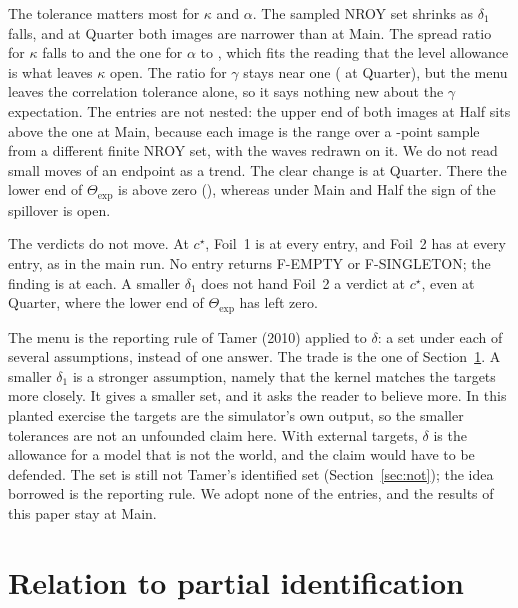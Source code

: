 \documentclass[11pt]{article}
\newcommand{\expset}{\mathrm{exp}}
\begin{document}
The tolerance matters most for $\kappa$ and $\alpha$. The sampled NROY set
shrinks as $\delta_1$ falls, and at Quarter both images are narrower than at
Main. The spread ratio for $\kappa$ falls to
\MenuDeltaQuarterSpreadRatioKappa{} and the one for $\alpha$ to
\MenuDeltaQuarterSpreadRatioAlpha, which fits the reading that the level
allowance is what leaves $\kappa$ open. The ratio for $\gamma$ stays near one
(\MenuDeltaQuarterSpreadRatioGamma{} at Quarter), but the menu leaves the
correlation tolerance alone, so it says nothing new about the $\gamma$
expectation. The entries are not nested: the upper end of both images at
Half sits above the one at Main, because each image is the range over a
\ThetaSample-point sample from a different finite NROY set, with the waves
redrawn on it. We do not read small moves of an endpoint as a trend. The
clear change is at Quarter. There the lower end of $\Theta_{\expset}$ is
above zero (\MenuDeltaQuarterThetaExpLo), whereas under Main and Half the
sign of the spillover is open.

The verdicts do not move. At $c^\star$, Foil~1 is
\MenuDeltaMainFoilOneVerdict{} at every entry, and Foil~2 has
\MenuDeltaMainFoilTwoVerdict{} at every entry, as in the main run. No entry
returns F-EMPTY or F-SINGLETON; the finding is \MenuDeltaMainFinding{} at each.
A smaller $\delta_1$ does not hand Foil~2 a verdict at $c^\star$, even
at Quarter, where the lower end of $\Theta_{\expset}$ has left zero.

The menu is the reporting rule of Tamer (2010) applied to $\delta$: a set
under each of several assumptions, instead of one answer. The trade is the
one of Section~\ref{sec:pi}. A smaller $\delta_1$ is a stronger assumption,
namely that the kernel matches the targets more closely. It gives a smaller
set, and it asks the reader to believe more. In this planted exercise the
targets are the simulator's own output, so the smaller tolerances are not an
unfounded claim here. With external targets, $\delta$ is the allowance for a
model that is not the world, and the claim would have to be defended. The
set is still not Tamer's identified set (Section~\ref{sec:not}); the idea
borrowed is the reporting rule. We adopt none of the entries, and the
results of this paper stay at Main.

\section{Relation to partial identification}
\label{sec:pi}
\end{document}
